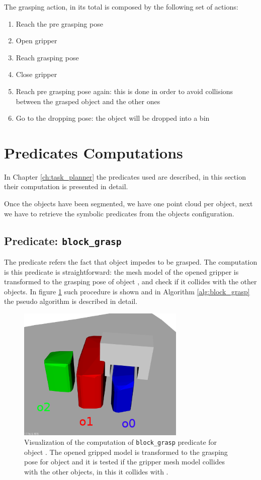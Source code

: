 The grasping action, in its total is composed by the following set of actions: 
\begin{enumerate}
\item Reach the pre grasping pose
\item Open gripper
\item Reach grasping pose
\item Close gripper
\item Reach pre grasping pose again: this is done in order to avoid collisions between the grasped object and the other ones
\item Go to the dropping pose: the object will be dropped into a bin
\end{enumerate}

\section{Predicates Computations}
In Chapter \ref{ch:task_planner}  the predicates used are described, in this section their computation is presented in detail. 

Once the objects have been segmented, we have one point cloud per object, next we have to retrieve the symbolic predicates from the objects configuration. 

\subsection{Predicate: \texttt{block\_grasp}}
The  predicate refers the fact that object  impedes  to be grasped. The computation is this predicate is straightforward: the mesh model of the opened gripper is transformed to the grasping pose of object , and check if it collides with the other objects. In figure \ref{fig:block_grasp} such procedure is shown and in Algorithm \ref{alg:block_grasp} the pseudo algorithm is described in detail. 

\begin{figure}[h]
\centering
\includegraphics[width=8cm]{Img/grasping/block_grasp.png}
\caption{Visualization of the computation of \texttt{block\_grasp} predicate for object . The opened gripped model is transformed to the grasping pose for object  and it is tested if the gripper mesh model collides with the other objects, in this it collides with . }\label{fig:block_grasp}
\end{figure}

